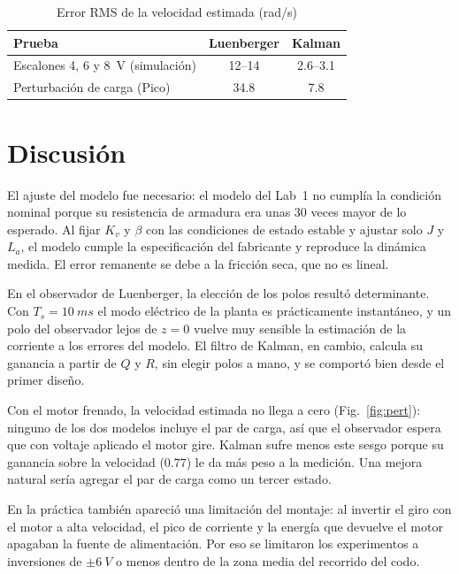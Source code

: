 \documentclass[conference,a4paper]{IEEEtran}
\begin{document}
\begin{table}[!t]
\centering
\caption{Error RMS de la velocidad estimada (\si{rad/s})}
\label{tab:rms}
\begin{tabular}{lcc}
\toprule
Prueba & Luenberger & Kalman \\
\midrule
Escalones 4, 6 y \SI{8}{V} (simulación) & 12--14 & 2.6--3.1 \\
Perturbación de carga (Pico) & 34.8 & 7.8 \\
\bottomrule
\end{tabular}
\end{table}

\section{Discusión}
El ajuste del modelo fue necesario: el modelo del Lab~1 no cumplía la condición nominal porque su resistencia de armadura era unas 30 veces mayor de lo esperado. Al fijar $K_v$ y $\beta$ con las condiciones de estado estable y ajustar solo $J$ y $L_a$, el modelo cumple la especificación del fabricante y reproduce la dinámica medida. El error remanente se debe a la fricción seca, que no es lineal.

En el observador de Luenberger, la elección de los polos resultó determinante. Con $T_s=\SI{10}{ms}$ el modo eléctrico de la planta es prácticamente instantáneo, y un polo del observador lejos de $z=0$ vuelve muy sensible la estimación de la corriente a los errores del modelo. El filtro de Kalman, en cambio, calcula su ganancia a partir de $Q$ y $R$, sin elegir polos a mano, y se comportó bien desde el primer diseño.

Con el motor frenado, la velocidad estimada no llega a cero (Fig.~\ref{fig:pert}): ninguno de los dos modelos incluye el par de carga, así que el observador espera que con voltaje aplicado el motor gire. Kalman sufre menos este sesgo porque su ganancia sobre la velocidad ($0.77$) le da más peso a la medición. Una mejora natural sería agregar el par de carga como un tercer estado.

En la práctica también apareció una limitación del montaje: al invertir el giro con el motor a alta velocidad, el pico de corriente y la energía que devuelve el motor apagaban la fuente de alimentación. Por eso se limitaron los experimentos a inversiones de $\pm\SI{6}{V}$ o menos dentro de la zona media del recorrido del codo.
\end{document}
